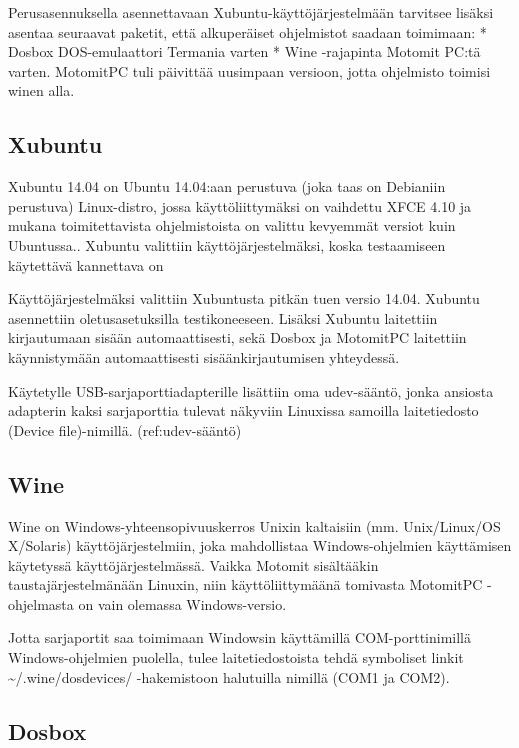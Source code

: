 \documentclass[11pt,a4paper,oneside,article]{memoir}
\begin{document}
Perusasennuksella asennettavaan Xubuntu-käyttöjärjestelmään tarvitsee
lisäksi asentaa seuraavat paketit, että alkuperäiset ohjelmistot saadaan
toimimaan: * Dosbox DOS-emulaattori Termania varten * Wine -rajapinta
Motomit PC:tä varten. MotomitPC tuli päivittää uusimpaan versioon, jotta
ohjelmisto toimisi winen alla.

\subsection{Xubuntu}

Xubuntu 14.04 on Ubuntu 14.04:aan perustuva (joka taas on Debianiin perustuva) Linux-distro, jossa 
käyttöliittymäksi on vaihdettu XFCE 4.10 ja mukana toimitettavista ohjelmistoista on valittu kevyemmät 
versiot kuin Ubuntussa.\cite{xubuntu:about}. Xubuntu valittiin käyttöjärjestelmäksi, koska testaamiseen 
käytettävä kannettava on 

Käyttöjärjestelmäksi valittiin Xubuntusta pitkän tuen versio 14.04.
Xubuntu asennettiin oletusasetuksilla testikoneeseen. Lisäksi Xubuntu
laitettiin kirjautumaan sisään automaattisesti, sekä Dosbox ja MotomitPC
laitettiin käynnistymään automaattisesti sisäänkirjautumisen yhteydessä.

Käytetylle USB-sarjaporttiadapterille lisättiin oma udev-sääntö, jonka
ansiosta adapterin kaksi sarjaporttia tulevat näkyviin Linuxissa
samoilla laitetiedosto (Device file)-nimillä. (ref:udev-sääntö)

\subsection{Wine}

Wine on Windows-yhteensopivuuskerros Unixin kaltaisiin (mm.
Unix/Linux/OS X/Solaris) käyttöjärjestelmiin, joka mahdollistaa
Windows-ohjelmien käyttämisen käytetyssä käyttöjärjestelmässä. Vaikka
Motomit sisältääkin taustajärjestelmänään
Linuxin\cite{motomit:manual}, niin käyttöliittymäänä tomivasta
MotomitPC -ohjelmasta on vain olemassa Windows-versio.

Jotta sarjaportit saa toimimaan Windowsin käyttämillä COM-porttinimillä
Windows-ohjelmien puolella, tulee laitetiedostoista tehdä symboliset
linkit \textasciitilde{}/.wine/dosdevices/ -hakemistoon halutuilla
nimillä (COM1 ja COM2).\cite[s. 21]{wine:manual}

\subsection{Dosbox}
\end{document}
